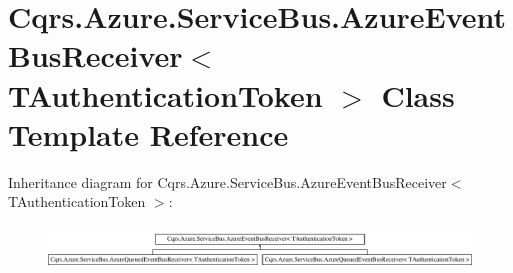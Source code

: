 \hypertarget{classCqrs_1_1Azure_1_1ServiceBus_1_1AzureEventBusReceiver}{}\section{Cqrs.\+Azure.\+Service\+Bus.\+Azure\+Event\+Bus\+Receiver$<$ T\+Authentication\+Token $>$ Class Template Reference}
\label{classCqrs_1_1Azure_1_1ServiceBus_1_1AzureEventBusReceiver}
Inheritance diagram for Cqrs.\+Azure.\+Service\+Bus.\+Azure\+Event\+Bus\+Receiver$<$ T\+Authentication\+Token $>$\+:\begin{figure}[H]
\begin{center}
\leavevmode
\includegraphics[height=1.154639cm]{classCqrs_1_1Azure_1_1ServiceBus_1_1AzureEventBusReceiver}
\end{center}
\end{figure}
